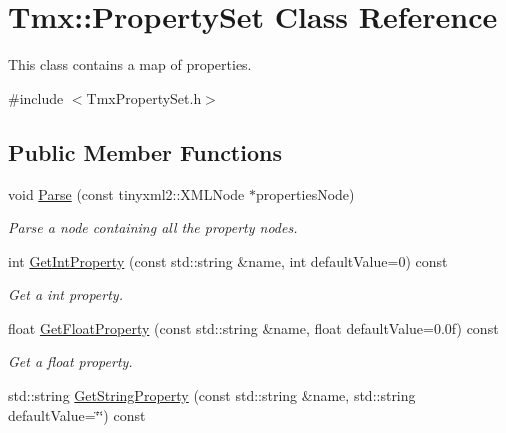 \hypertarget{classTmx_1_1PropertySet}{\section{Tmx\-:\-:Property\-Set Class Reference}
\label{classTmx_1_1PropertySet}
}


This class contains a map of properties.  




{\ttfamily \#include $<$Tmx\-Property\-Set.\-h$>$}

\subsection*{Public Member Functions}
\begin{DoxyCompactItemize}
\item 
\hypertarget{classTmx_1_1PropertySet_a242a55171b6dff9be49aa27fc157fec2}{void \hyperlink{classTmx_1_1PropertySet_a242a55171b6dff9be49aa27fc157fec2}{Parse} (const tinyxml2\-::\-X\-M\-L\-Node $\ast$properties\-Node)}\label{classTmx_1_1PropertySet_a242a55171b6dff9be49aa27fc157fec2}

\begin{DoxyCompactList}\small\item\em Parse a node containing all the property nodes. \end{DoxyCompactList}\item 
\hypertarget{classTmx_1_1PropertySet_ac83515f6a70328784ff88a7c95fc095c}{int \hyperlink{classTmx_1_1PropertySet_ac83515f6a70328784ff88a7c95fc095c}{Get\-Int\-Property} (const std\-::string \&name, int default\-Value=0) const }\label{classTmx_1_1PropertySet_ac83515f6a70328784ff88a7c95fc095c}

\begin{DoxyCompactList}\small\item\em Get a int property. \end{DoxyCompactList}\item 
\hypertarget{classTmx_1_1PropertySet_a5cda9c71a56fada3c938e3be1cf64a91}{float \hyperlink{classTmx_1_1PropertySet_a5cda9c71a56fada3c938e3be1cf64a91}{Get\-Float\-Property} (const std\-::string \&name, float default\-Value=0.\-0f) const }\label{classTmx_1_1PropertySet_a5cda9c71a56fada3c938e3be1cf64a91}

\begin{DoxyCompactList}\small\item\em Get a float property. \end{DoxyCompactList}\item 
\hypertarget{classTmx_1_1PropertySet_a307ae6b1427fba22a9304bf8ad1ef946}{std\-::string \hyperlink{classTmx_1_1PropertySet_a307ae6b1427fba22a9304bf8ad1ef946}{Get\-String\-Property} (const std\-::string \&name, std\-::string default\-Value=\char`\"{}\char`\"{}) const }\label{classTmx_1_1PropertySet_a307ae6b1427fba22a9304bf8ad1ef946}


\end{DoxyCompactItemize}
